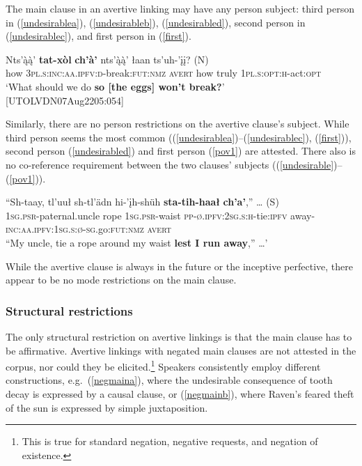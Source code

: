 \documentclass[output=paper,colorlinks,citecolor=brown]{langscibook}
\begin{document}
The main clause in an avertive linking may have any person subject: third person in (\ref{undesirablea}), (\ref{undesirableb}), (\ref{undesirabled}), second person in (\ref{undesirablec}), and first person in (\ref{first}). 

\ea \label{first}
\gll Nts'ą̀ą̀' \textbf{tat-xòl} \textbf{ch'à'} nts'ą̀ą̀' łaan {ts'uh-'įį? \textnormal{(N)}} \\
how \textsc{3pl.s:inc:aa.ipfv:d}-break:\textsc{fut:nmz} \textsc{avert} how truly \textsc{1pl.s:opt:h}-act:\textsc{opt} \\
\glt `What should we do \textbf{so [the eggs] won't break?}' \\ \hfill [UTOLVDN07Aug2205:054]
\z

Similarly, there are no person restrictions on the avertive clause's subject. While third person seems the most common ((\ref{undesirablea})--(\ref{undesirablec}), (\ref{first})), second person (\ref{undesirabled}) and first person (\ref{pov1}) are attested. There also is no co-reference requirement between the two clauses' subjects ((\ref{undesirable})--(\ref{pov1})).

\ea \label{pov1}
\gll ``Sh-taay, tl'uuł  sh-tl'ädn hi-'įh-shüh \textbf{sta-tih-haał} \textbf{ch'a'},''  {\ldots} \textnormal{(S})\\
\textsc{1sg.psr}-paternal.uncle rope \textsc{1sg.psr}-waist \textsc{pp-ø.ipfv:2sg.s:h}-tie:\textsc{ipfv} away-\textsc{inc:aa.ipfv:1sg.s:ø-sg}.go:\textsc{fut:nmz} \textsc{avert} \\
``My uncle, tie a rope around my waist \textbf{lest I run away},'' \ldots'\\ \hfill \citep[26]{TyoneM1996}
\z

While the avertive clause is always in the future or the inceptive perfective, there appear to be no mode restrictions on the main clause. 


\subsubsection{Structural restrictions}
\label{subsubsection:avertive-struct-restr}

The only structural restriction on avertive linkings is that the main clause has to be affirmative. Avertive linkings with negated main clauses are not attested in the corpus, nor could they be elicited.\footnote{This is true for standard negation, negative requests, and negation of existence.} Speakers consistently employ different constructions, e.g.\  (\ref{negmaina}), where the undesirable consequence of tooth decay is expressed by a causal clause, or (\ref{negmainb}), where Raven's feared theft of the sun is expressed by simple juxtaposition.
\end{document}
